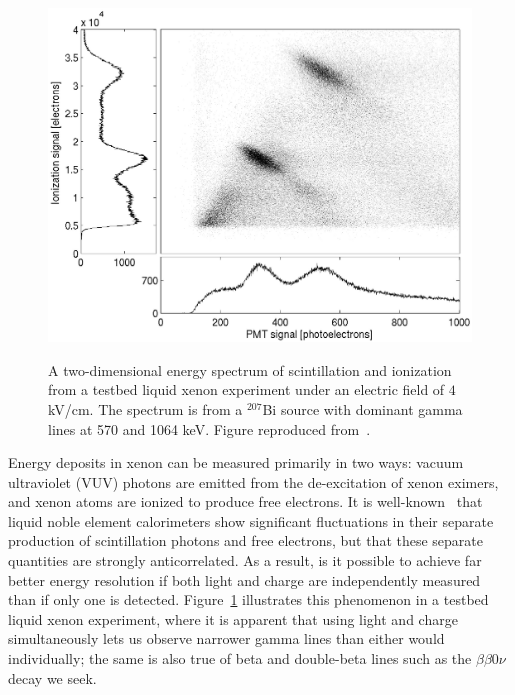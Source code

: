 \begin{figure}
\begin{center}
\includegraphics[keepaspectratio=true,width=\textwidth]{4kV_correl1.eps}
\end{center}
\renewcommand{\baselinestretch}{1}
\small\normalsize
\begin{quote}
\caption{A two-dimensional energy spectrum of scintillation and ionization from a testbed liquid xenon experiment under an electric field of $4$ kV/cm.  The spectrum is from a $^{207}$Bi source with dominant gamma lines at 570 and 1064 keV.  Figure reproduced from~\cite{PhysRevB.68.054201}.}
\label{fig:AnticorrelationInXenon}
\end{quote}
\end{figure}
\renewcommand{\baselinestretch}{2}
\small\normalsize

Energy deposits in xenon can be measured primarily in two ways: vacuum ultraviolet (VUV) photons are emitted from the de-excitation of xenon eximers, and xenon atoms are ionized to produce free electrons.  It is well-known~\cite{PhysRevB.68.054201} that liquid noble element calorimeters show significant fluctuations in their separate production of scintillation photons and free electrons, but that these separate quantities are strongly anticorrelated.  As a result, is it possible to achieve far better energy resolution if both light and charge are independently measured than if only one is detected. Figure~\ref{fig:AnticorrelationInXenon} illustrates this phenomenon in a testbed liquid xenon experiment, where it is apparent that using light and charge simultaneously lets us observe narrower gamma lines than either would individually; the same is also true of beta and double-beta lines such as the $\beta\beta 0\nu$ decay we seek.

